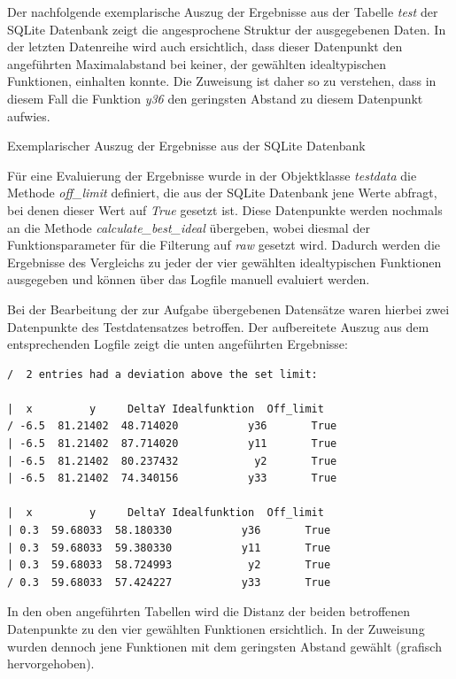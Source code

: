 Der nachfolgende exemplarische Auszug der Ergebnisse aus der Tabelle \emph{test} der SQLite Datenbank zeigt die angesprochene Struktur der ausgegebenen Daten. In der letzten Datenreihe wird auch ersichtlich, dass dieser Datenpunkt den angeführten Maximalabstand bei keiner, der gewählten idealtypischen Funktionen, einhalten konnte. Die Zuweisung ist daher so zu verstehen, dass in diesem Fall die Funktion \emph{y36} den geringsten Abstand zu diesem Datenpunkt aufwies.

\begin{table}[H]
\small
\centering
{}
\caption{Exemplarischer Auszug der Ergebnisse aus der SQLite Datenbank}
\label{tab:sqlitetest.csv}
\end{table} 

Für eine Evaluierung der Ergebnisse wurde in der Objektklasse \emph{testdata} die Methode \emph{off\_limit} definiert, die aus der SQLite Datenbank jene Werte abfragt, bei denen dieser Wert auf \emph{True} gesetzt ist. Diese Datenpunkte werden nochmals an die Methode \emph{calculate\_best\_ideal} übergeben, wobei diesmal der Funktionsparameter für die Filterung auf \emph{raw} gesetzt wird. Dadurch werden die Ergebnisse des Vergleichs zu jeder der vier gewählten idealtypischen Funktionen ausgegeben und können über das Logfile manuell evaluiert werden.

Bei der Bearbeitung der zur Aufgabe übergebenen Datensätze waren hierbei zwei Datenpunkte des Testdatensatzes betroffen. Der aufbereitete Auszug aus dem entsprechenden Logfile zeigt die unten angeführten Ergebnisse:

\begin{lstlisting}[caption={Datenpunkte mit überschrittenem Maximalabstand},
				   label=offlimit]
/  2 entries had a deviation above the set limit:

|  x         y     DeltaY Idealfunktion  Off_limit
/ -6.5  81.21402  48.714020           y36       True
| -6.5  81.21402  87.714020           y11       True
| -6.5  81.21402  80.237432            y2       True
| -6.5  81.21402  74.340156           y33       True

|  x         y     DeltaY Idealfunktion  Off_limit
| 0.3  59.68033  58.180330           y36       True
| 0.3  59.68033  59.380330           y11       True
| 0.3  59.68033  58.724993            y2       True
/ 0.3  59.68033  57.424227           y33       True
\end{lstlisting}

In den oben angeführten Tabellen wird die Distanz der beiden betroffenen Datenpunkte zu den vier gewählten Funktionen ersichtlich. In der Zuweisung wurden dennoch jene Funktionen mit dem geringsten Abstand gewählt (grafisch hervorgehoben).

